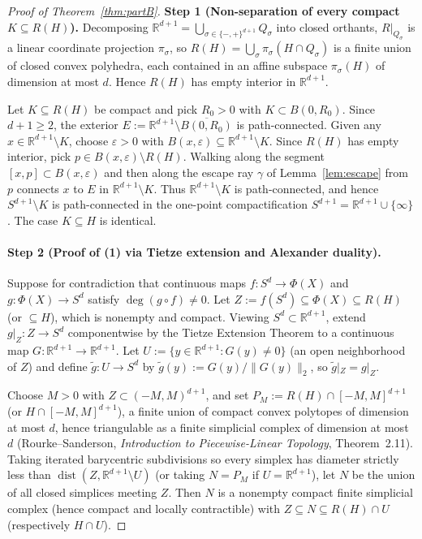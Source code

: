 \documentclass[11pt]{article}
\theoremstyle{plain}
\theoremstyle{definition}
\theoremstyle{remark}
\DeclareMathOperator{\dist}{dist}
\begin{document}
\begin{proof}[Proof of Theorem~\ref{thm:partB}]
\textbf{Step 1 (Non-separation of every compact $K \subseteq R(H)$).}
Decomposing $\mathbb{R}^{d+1} = \bigcup_{\sigma \in \{-,+\}^{d+1}} Q_\sigma$ into closed orthants, $R|_{Q_\sigma}$ is a linear coordinate projection $\pi_\sigma$, so $R(H) = \bigcup_\sigma \pi_\sigma(H \cap Q_\sigma)$ is a finite union of closed convex polyhedra, each contained in an affine subspace $\pi_\sigma(H)$ of dimension at most $d$. Hence $R(H)$ has empty interior in $\mathbb{R}^{d+1}$.

Let $K \subseteq R(H)$ be compact and pick $R_0 > 0$ with $K \subset B(0, R_0)$. Since $d + 1 \ge 2$, the exterior $E := \mathbb{R}^{d+1} \setminus \overline{B(0, R_0)}$ is path-connected. Given any $x \in \mathbb{R}^{d+1} \setminus K$, choose $\varepsilon > 0$ with $B(x, \varepsilon) \subseteq \mathbb{R}^{d+1} \setminus K$. Since $R(H)$ has empty interior, pick $p \in B(x, \varepsilon) \setminus R(H)$. Walking along the segment $[x, p] \subset B(x, \varepsilon)$ and then along the escape ray $\gamma$ of Lemma~\ref{lem:escape} from $p$ connects $x$ to $E$ in $\mathbb{R}^{d+1} \setminus K$. Thus $\mathbb{R}^{d+1} \setminus K$ is path-connected, and hence $S^{d+1} \setminus K$ is path-connected in the one-point compactification $S^{d+1} = \mathbb{R}^{d+1} \cup \{\infty\}$. The case $K \subseteq H$ is identical.

\paragraph{Step 2 (Proof of (1) via Tietze extension and Alexander duality).}
Suppose for contradiction that continuous maps $f : S^d \to \Phi(X)$ and $g : \Phi(X) \to S^d$ satisfy $\deg(g \circ f) \neq 0$. Let $Z := f(S^d) \subseteq \Phi(X) \subseteq R(H)$ (or $\subseteq H$), which is nonempty and compact. Viewing $S^d \subset \mathbb{R}^{d+1}$, extend $g|_Z : Z \to S^d$ componentwise by the Tietze Extension Theorem to a continuous map $G : \mathbb{R}^{d+1} \to \mathbb{R}^{d+1}$. Let $U := \{y \in \mathbb{R}^{d+1} : G(y) \neq 0\}$ (an open neighborhood of $Z$) and define $\tilde{g} : U \to S^d$ by $\tilde{g}(y) := G(y)/\|G(y)\|_2$, so $\tilde{g}|_Z = g|_Z$.

Choose $M > 0$ with $Z \subset (-M, M)^{d+1}$, and set $P_M := R(H) \cap [-M, M]^{d+1}$ (or $H \cap [-M, M]^{d+1}$), a finite union of compact convex polytopes of dimension at most $d$, hence triangulable as a finite simplicial complex of dimension at most $d$ (Rourke--Sanderson, \emph{Introduction to Piecewise-Linear Topology}, Theorem~2.11). Taking iterated barycentric subdivisions so every simplex has diameter strictly less than $\dist(Z, \mathbb{R}^{d+1} \setminus U)$ (or taking $N = P_M$ if $U = \mathbb{R}^{d+1}$), let $N$ be the union of all closed simplices meeting $Z$. Then $N$ is a nonempty compact finite simplicial complex (hence compact and locally contractible) with $Z \subseteq N \subseteq R(H) \cap U$ (respectively $H \cap U$).


\end{proof}
\end{document}
